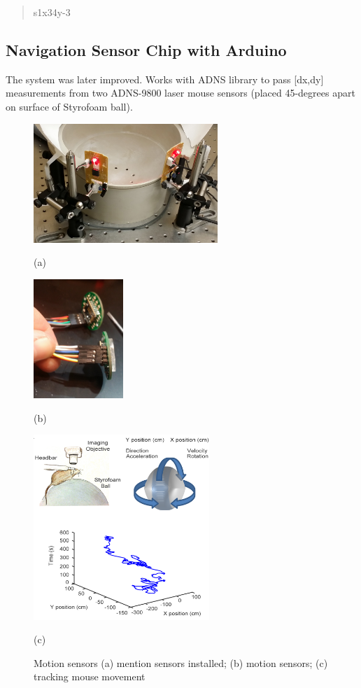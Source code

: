 \begin{quote}
s1x34y-3
\end{quote}

\subsection{Navigation Sensor Chip with
Arduino}\label{navigation-sensor-chip-with-arduino}

The system was later improved. Works with ADNS library to pass
{[}dx,dy{]} measurements from two ADNS-9800 laser mouse sensors (placed
45-degrees apart on surface of Styrofoam ball).


\begin{figure}[htb]
  \begin{minipage}[t]{0.45\linewidth}\centering
    \includegraphics[height=4.5cm]{2_Body/Figures/01-motion-sensors-installed.jpg}
    \centerline{(a)}
  \end{minipage}\hfill
  \begin{minipage}[t]{0.45\linewidth}\centering
    \includegraphics[height=4.5cm]{2_Body/Figures/02-motion-sensors.jpg}
        \centerline{(b)}
  \end{minipage}
  \begin{minipage}[t]{\linewidth}\centering
    \includegraphics[height=7cm]{2_Body/Figures/Striatum_Figure2.png}
    \centerline{(c)}
  \end{minipage}
  \caption{Motion sensors (a) mention sensors installed; (b) motion sensors; (c) tracking mouse movement}
  \label{fig:motion sensors}
\end{figure}


